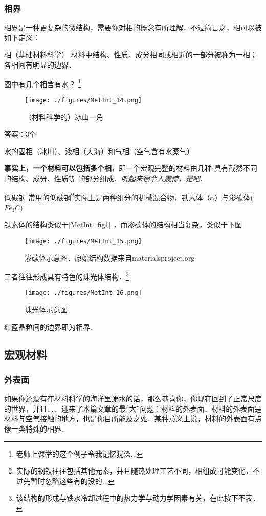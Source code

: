 \subsubsection{相界}
相界是一种更复杂的微结构，需要你对相的概念有所理解．不过简言之，相可以被如下定义：
\begin{definition}{相（基础材料科学）}
材料中结构、性质、成分相同或相近的一部分被称为一相；各相间有明显的边界．
\end{definition}

\begin{example}{图中有几个相含有水？}
\footnote{老师上课举的这个例子令我记忆犹深...}
\begin{figure}[ht]
\centering
\texttt{[image: ./figures/MetInt\_14.png]}
\caption{（材料科学的）冰山一角} \label{MetInt_fig14}
\end{figure}
答案：3个

水的固相（冰川）、液相（大海）和气相（空气含有水蒸气）
\end{example}

\textbf{事实上，一个材料可以包括多个相}，即一个宏观完整的材料由几种 具有截然不同的结构、成分、性质等 的部分组成．\textsl{听起来很令人震惊，是吧}．

\begin{example}{低碳钢}
常用的低碳钢\footnote{实际的钢铁往往包括其他元素，并且随热处理工艺不同，相组成可能变化．不过先暂时忽略这些有的没的...}实际上是两种组分的机械混合物，铁素体（$\alpha$）与渗碳体($Fe_3C$)

铁素体的结构类似于\autoref{MetInt_fig1} ，而渗碳体的结构相当复杂，类似于下图
\begin{figure}[ht]
\centering
\texttt{[image: ./figures/MetInt\_15.png]}
\caption{渗碳体示意图．原始结构数据来自materialsproject.org} \label{MetInt_fig15}
\end{figure}
二者往往形成具有特色的珠光体结构．\footnote{该结构的形成与铁水冷却过程中的热力学与动力学因素有关，在此按下不表．}
\begin{figure}[ht]
\centering
\texttt{[image: ./figures/MetInt\_16.png]}
\caption{珠光体示意图} \label{MetInt_fig16}
\end{figure}
红蓝晶粒间的边界即为相界．
\end{example}

\subsection{宏观材料}
\subsubsection{外表面}
如果你还没有在材料科学的海洋里溺水的话，那么恭喜你，你现在回到了正常尺度的世界，并且．．．迎来了本篇文章的最“大”问题：材料的外表面．材料的外表面是材料与空气接触的地方，也是你目所能及之处．某种意义上说，材料的外表面有点像一类特殊的相界．

